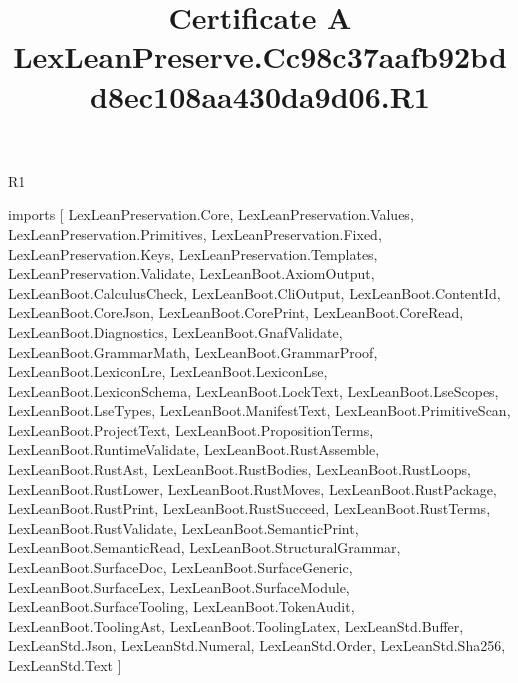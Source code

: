 \begin{lexlean}{R1}
\title{Certificate A LexLeanPreserve.Cc98c37aafb92bdd8ec108aa430da9d06.R1}
\begin{coremodule}
imports [
  LexLeanPreservation.Core,
  LexLeanPreservation.Values,
  LexLeanPreservation.Primitives,
  LexLeanPreservation.Fixed,
  LexLeanPreservation.Keys,
  LexLeanPreservation.Templates,
  LexLeanPreservation.Validate,
  LexLeanBoot.AxiomOutput,
  LexLeanBoot.CalculusCheck,
  LexLeanBoot.CliOutput,
  LexLeanBoot.ContentId,
  LexLeanBoot.CoreJson,
  LexLeanBoot.CorePrint,
  LexLeanBoot.CoreRead,
  LexLeanBoot.Diagnostics,
  LexLeanBoot.GnafValidate,
  LexLeanBoot.GrammarMath,
  LexLeanBoot.GrammarProof,
  LexLeanBoot.LexiconLre,
  LexLeanBoot.LexiconLse,
  LexLeanBoot.LexiconSchema,
  LexLeanBoot.LockText,
  LexLeanBoot.LseScopes,
  LexLeanBoot.LseTypes,
  LexLeanBoot.ManifestText,
  LexLeanBoot.PrimitiveScan,
  LexLeanBoot.ProjectText,
  LexLeanBoot.PropositionTerms,
  LexLeanBoot.RuntimeValidate,
  LexLeanBoot.RustAssemble,
  LexLeanBoot.RustAst,
  LexLeanBoot.RustBodies,
  LexLeanBoot.RustLoops,
  LexLeanBoot.RustLower,
  LexLeanBoot.RustMoves,
  LexLeanBoot.RustPackage,
  LexLeanBoot.RustPrint,
  LexLeanBoot.RustSucceed,
  LexLeanBoot.RustTerms,
  LexLeanBoot.RustValidate,
  LexLeanBoot.SemanticPrint,
  LexLeanBoot.SemanticRead,
  LexLeanBoot.StructuralGrammar,
  LexLeanBoot.SurfaceDoc,
  LexLeanBoot.SurfaceGeneric,
  LexLeanBoot.SurfaceLex,
  LexLeanBoot.SurfaceModule,
  LexLeanBoot.SurfaceTooling,
  LexLeanBoot.TokenAudit,
  LexLeanBoot.ToolingAst,
  LexLeanBoot.ToolingLatex,
  LexLeanStd.Buffer,
  LexLeanStd.Json,
  LexLeanStd.Numeral,
  LexLeanStd.Order,
  LexLeanStd.Sha256,
  LexLeanStd.Text
]


\end{coremodule}
\end{lexlean}
